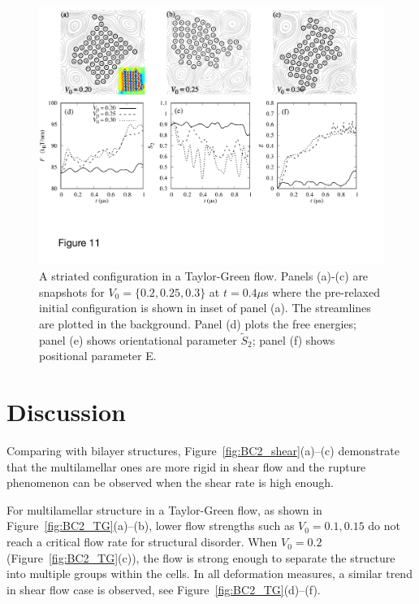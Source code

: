 \documentclass[aps,prl,preprint,groupedaddress]{revtex4-2}
\begin{document}
\begin{figure}
  \begin{center}
\includegraphics[width=1.0\textwidth]{Figures/Figure11.pdf}            
  \end{center}
  \vspace{-20pt}  
  \caption{\label{fig:BC3_TG} A striated configuration in a Taylor-Green flow. Panels (a)-(c) are snapshots for $V_0=\{0.2, 0.25, 0.3\}$ at $t=0.4\mu$s where the pre-relaxed initial configuration is shown in inset of panel (a). The streamlines are plotted in the background.
Panel (d) plots the free energies; panel (e) shows orientational parameter $\tilde{S}_2$; panel (f) shows positional parameter E.
}
\end{figure}





\section{Discussion}

Comparing with bilayer structures, Figure~\ref{fig:BC2_shear}(a)--(c) demonstrate that the multilamellar ones are more rigid in shear flow and the rupture phenomenon can be observed 
when the shear rate is high enough.

For multilamellar structure in a Taylor-Green flow, as shown in Figure~\ref{fig:BC2_TG}(a)--(b), lower flow strengths such as $V_0=0.1,0.15$ do not reach a critical flow rate for structural disorder. 
When $V_0=0.2$ (Figure~\ref{fig:BC2_TG}(c)), the flow is strong enough to separate the structure
into multiple groups within the cells. In all deformation measures, a similar trend in shear flow case is observed, see Figure~\ref{fig:BC2_TG}(d)--(f). 
\end{document}
